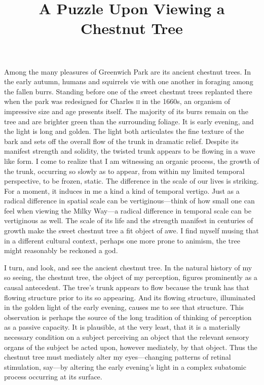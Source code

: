 \documentclass[12pt]{article}
\title{A Puzzle Upon Viewing a Chestnut Tree}
\author{\myauthor}
\date{} %
\begin{document}
\maketitle

\setlength{\parindent}{1em}



Among the many pleasures of Greenwich Park are its ancient chestnut trees. In the early autumn, humans and squirrels vie with one another in foraging among the fallen burrs. Standing before one of the sweet chestnut trees replanted there when the park was redesigned for Charles \textsc{ii} in the 1660s, an organism of impressive size and age presents itself. The majority of its burrs remain on the tree and are brighter green than the surrounding foliage. It is early evening, and the light is long and golden. The light both articulates the fine texture of the bark and sets off the overall flow of the trunk in dramatic relief. Despite its manifest strength and solidity, the twisted trunk appears to be flowing in a wave like form. I come to realize that I am witnessing an organic process, the growth of the trunk, occurring so slowly as to appear, from within my limited temporal perspective, to be frozen, static. The difference in the scale of our lives is striking. For a moment, it induces in me a kind a kind of temporal vertigo.  Just as a radical difference in spatial scale can be vertiginous---think of how small one can feel when viewing the Milky Way---a radical difference in temporal scale can be vertiginous as well. The scale of its life and the strength manifest in centuries of growth make the sweet chestnut tree a fit object of awe. I find myself musing that in a different cultural context, perhaps one more prone to animism, the tree might reasonably be reckoned a god. 

I turn, and look, and see the ancient chestnut tree. In the natural history of my so seeing, the chestnut tree, the object of my perception, figures prominently as a causal antecedent. The tree's trunk appears to flow because the trunk has that flowing structure prior to its so appearing. And its flowing structure, illuminated in the golden light of the early evening, causes me to see that structure. This observation is perhaps the source of the long tradition of thinking of perception as a passive capacity. It is plausible, at the very least, that it is a materially necessary condition on a subject perceiving an object that the relevant sensory organs of the subject be acted upon, however mediately, by that object. Thus the chestnut tree must mediately alter my eyes---changing patterns of retinal stimulation, say---by altering the early evening's light in a complex subatomic process occurring at its surface.
\end{document}
